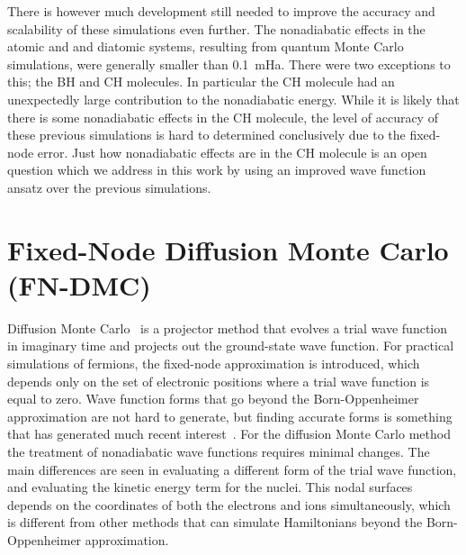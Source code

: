 \documentclass[aip,jcp,numerical,reprint]{revtex4-1}
\begin{document}
There is however much development still needed to improve the accuracy and scalability of these simulations even further.  The nonadiabatic effects in the atomic and and diatomic systems, resulting from quantum Monte Carlo simulations,  were generally smaller than 0.1~mHa. There were two exceptions to this; the BH and CH molecules. In particular the CH molecule had an unexpectedly large contribution to the nonadiabatic energy.   While it is likely that there is some nonadiabatic effects in the CH molecule, the level of accuracy of these previous simulations is hard to determined conclusively due to the fixed-node error.   Just how nonadiabatic effects are in the CH molecule is an open question which we address in this work by using an improved wave function ansatz over the previous simulations.


\section{Fixed-Node Diffusion Monte Carlo (FN-DMC)}
Diffusion Monte Carlo~\cite{Anderson_DMC,lester1,Stuart_Review,Needs_Review,Needs_Old_Review,QMC_Review} is a projector method that evolves a trial wave function in imaginary time and projects out the ground-state wave function. For practical simulations of fermions, the fixed-node approximation is introduced, which depends only on the set of electronic positions where a trial wave function is equal to zero.  %
  Wave function forms that go beyond the Born-Oppenheimer approximation are not hard to generate, but finding accurate forms is something that has generated  much recent interest~\cite{cederbaum1,cederbaum12,Tubman_ECG,boent,gross2014}.  For the diffusion Monte Carlo method the treatment of nonadiabatic wave functions requires minimal changes.  The main differences are seen in evaluating a different form of the trial wave function, and  evaluating the kinetic energy term for the nuclei.   This nodal surfaces  depends on the coordinates of both the electrons and ions simultaneously, which is different from other methods that can simulate Hamiltonians beyond the Born-Oppenheimer approximation\cite{mitroy2013,Kurt_XCNEO-HF,Sharon_NEO-DFT,kerley2013}.%
\end{document}
